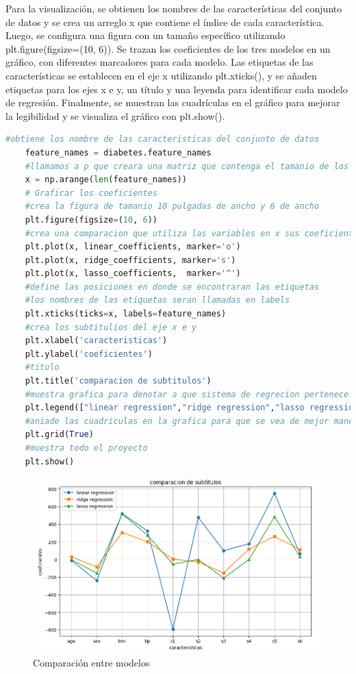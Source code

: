\documentclass[12pt]{article}
\begin{document}
	Para la visualización, se obtienen los nombres de las características del conjunto de datos y se crea un arreglo x que contiene el índice de cada característica. Luego, se configura una figura con un tamaño específico utilizando plt.figure(figsize=(10, 6)). Se trazan los coeficientes de los tres modelos en un gráfico, con diferentes marcadores para cada modelo. Las etiquetas de las características se establecen en el eje x utilizando plt.xticks(), y se añaden etiquetas para los ejes x e y, un título y una leyenda para identificar cada modelo de regresión. Finalmente, se muestran las cuadrículas en el gráfico para mejorar la legibilidad y se visualiza el gráfico con plt.show().
	
	\begin{lstlisting}[language=Python]
	#obtiene los nombre de las caracteristicas del conjunto de datos
	feature_names = diabetes.feature_names
	#llamamos a p que creara una matriz que contenga el tamanio de los nombres de las caracteristicas
	x = np.arange(len(feature_names))
	# Graficar los coeficientes
	#crea la figura de tamanio 10 pulgadas de ancho y 6 de ancho
	plt.figure(figsize=(10, 6))
	#crea una comparacion que utiliza las variables en x sus coeficientes(el marker sirve para cambiar la forma de los puntos escogidos)
	plt.plot(x, linear_coefficients, marker='o')
	plt.plot(x, ridge_coefficients, marker='s')
	plt.plot(x, lasso_coefficients,  marker='^')
	#define las posiciones en donde se encontraran las etiquetas
	#los nombres de las etiquetas seran llamadas en labels
	plt.xticks(ticks=x, labels=feature_names)
	#crea los subtitulios del eje x e y
	plt.xlabel('caracteristicas')
	plt.ylabel('coeficientes')
	#titulo
	plt.title('comparacion de subtitulos')
	#muestra grafica para denotar a que sistema de regrecion pertenece
	plt.legend(["linear regression","ridge regression","lasso regression"])
	#aniade las cuadriculas en la grafica para que se vea de mejor manera
	plt.grid(True)
	#muestra todo el proyecto
	plt.show()
	\end{lstlisting}
	
\begin{figure}[h]
	\centering
	\includegraphics[width=0.9\linewidth]{imagenes/Figure1}
	\caption{Comparación entre modelos}
	\label{fig:figure1}
\end{figure}
	
\end{document}
